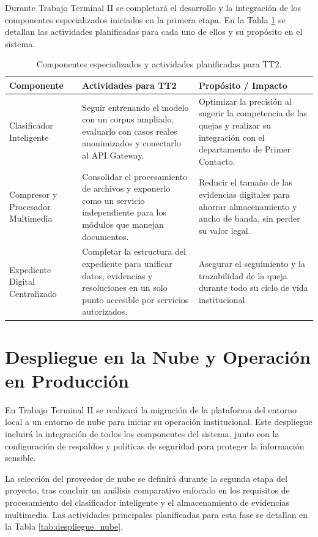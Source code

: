Durante Trabajo Terminal II se completará el desarrollo y la integración de los componentes especializados iniciados en la primera etapa. En la Tabla \ref{tab:componentes_especializados} se detallan las actividades planificadas para cada uno de ellos y su propósito en el sistema.

\begin{table}[ht]
\centering
\caption{Componentes especializados y actividades planificadas para TT2.}
\label{tab:componentes_especializados}
\begin{tabular}{|p{3.5cm}|p{5.5cm}|p{5.5cm}|}
\hline
\textbf{Componente} & \textbf{Actividades para TT2} & \textbf{Propósito / Impacto} \\ \hline
Clasificador Inteligente & Seguir entrenando el modelo con un corpus ampliado, evaluarlo con casos reales anonimizados y conectarlo al API Gateway. & Optimizar la precisión al sugerir la competencia de las quejas y realizar su integración con el departamento de Primer Contacto. \\ \hline
Compresor y Procesador Multimedia & Consolidar el procesamiento de archivos y exponerlo como un servicio independiente para los módulos que manejan documentos. & Reducir el tamaño de las evidencias digitales para ahorrar almacenamiento y ancho de banda, sin perder su valor legal. \\ \hline
Expediente Digital Centralizado & Completar la estructura del expediente para unificar datos, evidencias y resoluciones en un solo punto accesible por servicios autorizados. & Asegurar el seguimiento y la trazabilidad de la queja durante todo su ciclo de vida institucional. \\ \hline
\end{tabular}
\end{table}
\section{Despliegue en la Nube y Operación en Producción}

En Trabajo Terminal II se realizará la migración de la plataforma del entorno local a un entorno de nube para iniciar su operación institucional. Este despliegue incluirá la integración de todos los componentes del sistema, junto con la configuración de respaldos y políticas de seguridad para proteger la información sensible. 

La selección del proveedor de nube se definirá durante la segunda etapa del proyecto, tras concluir un análisis comparativo enfocado en los requisitos de procesamiento del clasificador inteligente y el almacenamiento de evidencias multimedia. Las actividades principales planificadas para esta fase se detallan en la Tabla \ref{tab:despliegue_nube}.


